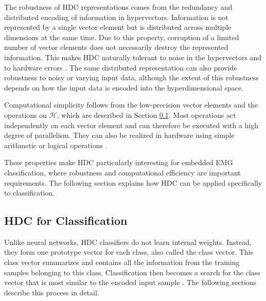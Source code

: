     The robustness of HDC representations comes from the redundancy and distributed encoding of information in hypervectors. Information is not represented by a single vector element but is distributed across multiple dimensions at the same time. Due to this property, corruption of a limited number of vector elements does not necessarily destroy the represented information. This makes HDC naturally tolerant to noise in the hypervectors and to hardware errors \cite{schlegel_comparison_2022}. The same distributed representation can also provide robustness to noisy or varying input data, although the extent of this robustness depends on how the input data is encoded into the hyperdimensional space.
    
    Computational simplicity follows from the low-precision vector elements and the operations on $\mathcal{H}$, which are described in Section \ref{sec:HDC_classification}. Most operations act independently on each vector element and can therefore be executed with a high degree of parallelism. They can also be realized in hardware using simple arithmetic or logical operations \cite{thomas_theoretical_2021}.
    

    These properties make HDC particularly interesting for embedded EMG classification, where robustness and computational efficiency are important requirements. The following section explains how HDC can be applied specifically to classification.
    
    \subsection{HDC for Classification}
    \label{sec:HDC_classification}
    Unlike neural networks, HDC classifiers do not learn internal weights. Instead, they form one prototype vector for each class, also called the class vector. This class vector summarizes and contains all the information from the training samples belonging to this class. Classification then becomes a search for the class vector that is most similar to the encoded input sample \cite{kanerva_hyperdimensional_2009}. The following sections describe this process in detail.
    
